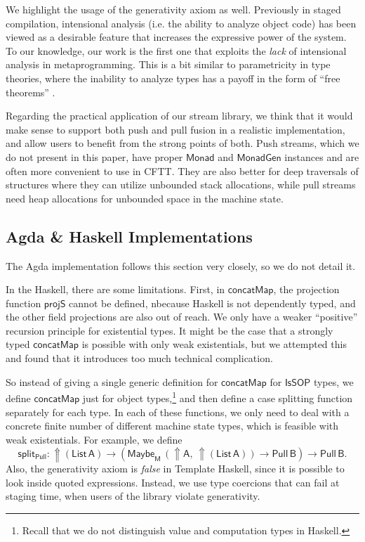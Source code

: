 \documentclass[acmsmall,screen,review,anonymous]{acmart}
\newcommand{\mit}[1]{{\mathsf{#1}}}
\newcommand{\msf}[1]{{\mathsf{#1}}}
\newcommand{\M}{\msf{M}}
\newcommand{\vA}{\mathsf{A}}
\newcommand{\vB}{\mathsf{B}}
\newcommand{\IsSOP}{\msf{IsSOP}}
\newcommand{\List}{\msf{List}}
\newcommand{\Monad}{\msf{Monad}}
\newcommand{\concatMap}{\msf{concatMap}}
\newcommand{\Lift}{{\Uparrow}}
\newcommand{\Maybe}{\msf{Maybe}}
\theoremstyle{remark}
\newcommand{\MonadGen}{\msf{MonadGen}}
\newcommand{\Pull}{\msf{Pull}}
\begin{document}
We highlight the usage of the generativity axiom as well. Previously in staged
compilation, intensional analysis (i.e. the ability to analyze object code) has
been viewed as a desirable feature that increases the expressive power of the
system. To our knowledge, our work is the first one that exploits the
\emph{lack} of intensional analysis in metaprogramming. This is a bit similar to
parametricity in type theories, where the inability to analyze types has a
payoff in the form of ``free theorems'' \cite{TODO}.

Regarding the practical application of our stream library, we think that it
would make sense to support both push and pull fusion in a realistic
implementation, and allow users to benefit from the strong points of both. Push
streams, which we do not present in this paper, have proper $\Monad$ and
$\MonadGen$ instances and are often more convenient to use in CFTT. They are
also better for deep traversals of structures where they can utilize unbounded
stack allocations, while pull streams need heap allocations for unbounded space
in the machine state.

\subsection{Agda \& Haskell Implementations}

The Agda implementation follows this section very closely, so we do not detail it.

In the Haskell, there are some limitations. First, in $\concatMap$, the
projection function $\mit{projS}$ cannot be defined, nbecause Haskell is not
dependently typed, and the other field projections are also out of reach. We
only have a weaker ``positive'' recursion principle for existential types. It
might be the case that a strongly typed $\concatMap$ is possible with only weak
existentials, but we attempted this and found that it introduces too much
technical complication.

So instead of giving a single generic definition for $\concatMap$ for $\IsSOP$
types, we define $\concatMap$ just for object types,\footnote{Recall that we do
not distinguish value and computation types in Haskell.} and then define a case
splitting function separately for each type. In each of these functions, we only
need to deal with a concrete finite number of different machine state types,
which is feasible with weak existentials. For example, we define
\[ \mit{split_{\Pull}} : \Lift (\List\,\vA) \to (\Maybe_\M\,(\Lift \vA,\,\Lift (\List\,\vA)) \to \Pull\,\vB) \to \Pull\,\vB. \]
Also, the generativity axiom is \emph{false} in Template Haskell, since it is
possible to look inside quoted expressions. Instead, we use type coercions that
can fail at staging time, when users of the library violate generativity.
\end{document}
